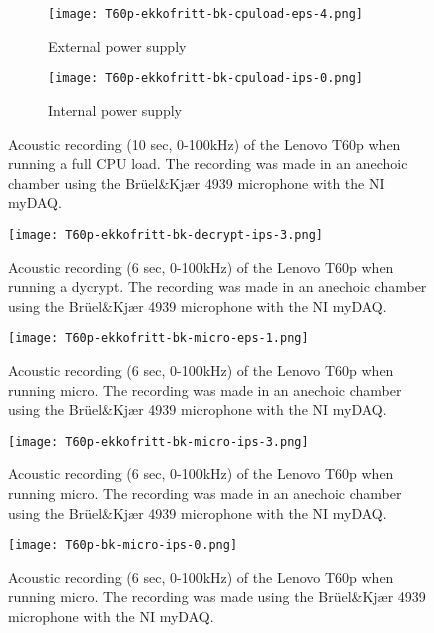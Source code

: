 \begin{wrapfigure}{r}{1\textwidth}
	\begin{subfigure}{0.5\textwidth}
	    \centering
	    \texttt{[image: T60p-ekkofritt-bk-cpuload-eps-4.png]}
	    \caption{External power supply}
	    \label{fig:T60p-ekkofritt-bk-cpuload-eps-4}
    \end{subfigure}
    \begin{subfigure}{0.5\textwidth}
	    \centering
	    \texttt{[image: T60p-ekkofritt-bk-cpuload-ips-0.png]}
	    \caption{Internal power supply}
	    \label{fig:T60p-ekkofritt-bk-cpuload-ips-0}
    \end{subfigure}
    \caption{Acoustic recording (10 sec, 0-100kHz) of the Lenovo T60p when running a full CPU load. The recording was made in an anechoic chamber using the Brüel\&Kjær 4939 microphone with the NI myDAQ.}
	\label{fig:T60p-ekkofritt-bk-cpuload}
\end{wrapfigure}


\begin{wrapfigure}{r}{1\textwidth}
    \centering
    \texttt{[image: T60p-ekkofritt-bk-decrypt-ips-3.png]}
    \caption{Acoustic recording (6 sec, 0-100kHz) of the Lenovo T60p when running a dycrypt. The recording was made in an anechoic chamber using the Brüel\&Kjær 4939 microphone with the NI myDAQ. }
    \label{fig:T60p-ekkofritt-bk-decrypt-ips-3}
\end{wrapfigure}

\begin{wrapfigure}{r}{1\textwidth}
    \centering
    \texttt{[image: T60p-ekkofritt-bk-micro-eps-1.png]}
    \caption{Acoustic recording (6 sec, 0-100kHz) of the Lenovo T60p when running micro. The recording was made in an anechoic chamber using the Brüel\&Kjær 4939 microphone with the NI myDAQ. }
    \label{fig:T60p-ekkofritt-bk-micro-eps-1}
\end{wrapfigure}

\begin{wrapfigure}{r}{1\textwidth}
    \centering
    \texttt{[image: T60p-ekkofritt-bk-micro-ips-3.png]}
    \caption{Acoustic recording (6 sec, 0-100kHz) of the Lenovo T60p when running micro. The recording was made in an anechoic chamber using the Brüel\&Kjær 4939 microphone with the NI myDAQ. }
    \label{fig:T60p-ekkofritt-bk-micro-ips-3}
\end{wrapfigure}

\begin{wrapfigure}{r}{1\textwidth}
    \centering
    \texttt{[image: T60p-bk-micro-ips-0.png]}
    \caption{Acoustic recording (6 sec, 0-100kHz) of the Lenovo T60p when running micro. The recording was made using the Brüel\&Kjær 4939 microphone with the NI myDAQ. }
    \label{fig:T60p-bk-micro-ips-0}
\end{wrapfigure}

